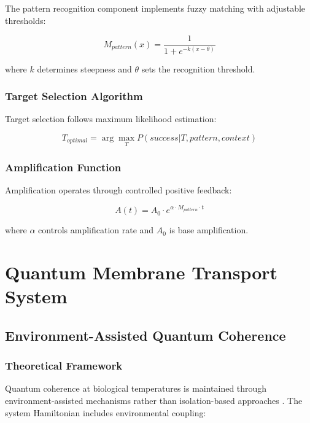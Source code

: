 \documentclass[12pt,a4paper]{article}
\begin{document}
The pattern recognition component implements fuzzy matching with adjustable thresholds:

\begin{equation}
M_{pattern}(x) = \frac{1}{1 + e^{-k(x - \theta)}}
\end{equation}

where $k$ determines steepness and $\theta$ sets the recognition threshold.

\subsubsection{Target Selection Algorithm}

Target selection follows maximum likelihood estimation:

\begin{equation}
T_{optimal} = \arg\max_T P(success|T, pattern, context)
\end{equation}

\subsubsection{Amplification Function}

Amplification operates through controlled positive feedback:

\begin{equation}
A(t) = A_0 \cdot e^{\alpha \cdot M_{pattern} \cdot t}
\end{equation}

where $\alpha$ controls amplification rate and $A_0$ is base amplification.

\section{Quantum Membrane Transport System}

\subsection{Environment-Assisted Quantum Coherence}

\subsubsection{Theoretical Framework}

Quantum coherence at biological temperatures is maintained through environment-assisted mechanisms rather than isolation-based approaches \cite{lloyd2011quantum}. The system Hamiltonian includes environmental coupling:
\end{document}
